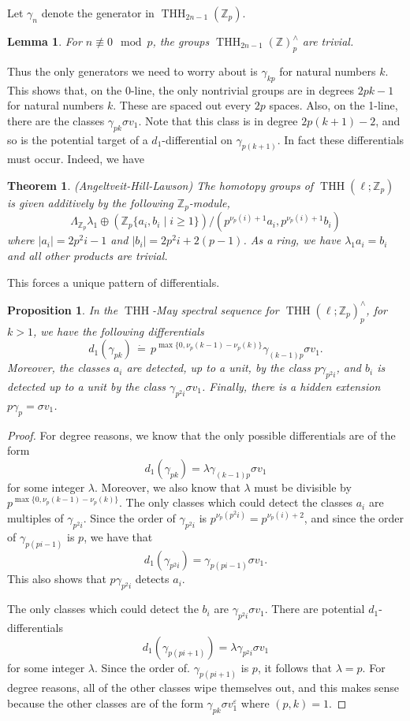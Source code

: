 \documentclass[12pt]{amsart}
\newcommand{\Z}{\mathbb{Z}}
\DeclareMathOperator{\THH}{THH}
\newtheorem{thm}[equation]{Theorem}
\newtheorem{lem}[equation]{Lemma}
\newtheorem{prop}[equation]{Proposition}
\theoremstyle{definition}
\numberwithin{equation}{section}
\numberwithin{figure}{section}
\begin{document}
Let $\gamma_n$ denote the generator in $\THH_{2n-1}(\Z_p)$. 

\begin{lem}
	For $n\not\equiv 0\mod p$, the groups $\THH_{2n-1}(\Z)^\wedge_p$ are trivial.
\end{lem}

Thus the only generators we need to worry about is $\gamma_{kp}$ for natural numbers $k$. This shows that, on the 0-line, the only nontrivial groups are in degrees $2pk-1$ for natural numbers $k$. These are spaced out every $2p$ spaces. Also, on the 1-line, there are the classes $\gamma_{pk}\sigma v_1$. Note that this class is in degree $2p(k+1)-2$, and so is the potential target of a $d_1$-differential on $\gamma_{p(k+1)}$. In fact these differentials must occur. Indeed, we have 

\begin{thm}(Angeltveit-Hill-Lawson)
	The homotopy groups of $\THH(\ell;\Z_p)$ is given additively by the following $\Z_p$-module, 
	\[
	\Lambda_{\Z_p}\lambda_1\oplus\left(\Z_p\{a_i, b_i\mid i\geq 1\}\right)/(p^{\nu_p(i)+1}a_i,p^{\nu_p(i)+1}b_i)
	\]
	where $|a_i| = 2p^2i-1$ and $|b_i| = 2p^2i+2(p-1)$. As a ring, we have $\lambda_1a_i = b_i$ and all other products are trivial.
\end{thm}

This forces a unique pattern of differentials. 

\begin{prop}
	In the $\THH$-May spectral sequence for $\THH(\ell;\Z_p)^\wedge_p$, for $k>1$, we have the following differentials
	\[
	d_1(\gamma_{pk}) \, \dot{=}\, p^{\max\{0, \nu_p(k-1)-\nu_p(k)\}}\gamma_{(k-1)p}\sigma v_1.
	\]
	Moreover, the classes $a_i$ are detected, up to a unit, by the class $p\gamma_{p^2i}$, and $b_i$ is detected up to a unit by the class $\gamma_{p^2i}\sigma v_1$. Finally, there is a hidden extension $p \gamma_p = \sigma v_1$.
\end{prop}
\begin{proof}
	
	For degree reasons, we know that the only possible differentials are of the form 
	\[
	d_1(\gamma_{pk}) = \lambda \gamma_{(k-1)p}\sigma v_1
	\]
	for some integer $\lambda$. Moreover, we also know that $\lambda$ must be divisible by $p^{\max\{0, \nu_p(k-1)-\nu_p(k)\}}$. The only classes which could detect the classes $a_i$ are multiples of $\gamma_{p^2i}$. Since the order of $\gamma_{p^2i}$ is $p^{\nu_p(p^2i)} = p^{\nu_p(i)+2}$, and since the order of $\gamma_{p(pi-1)}$ is $p$, we have that 
	\[
	d_1(\gamma_{p^2i}) = \gamma_{p(pi-1)}\sigma v_1. 
	\]
	This also shows that $p\gamma_{p^2i}$ detects $a_i$. 
	
	The only classes which could detect the $b_i$ are $\gamma_{p^2i}\sigma v_1$. There are potential $d_1$-differentials
	\[
	d_1(\gamma_{p(pi+1)}) = \lambda \gamma_{p^2i}\sigma v_1
	\]
	for some integer $\lambda$. Since the order of. $\gamma_{p(pi+1)}$ is $p$, it follows that $\lambda = p$. For degree reasons, all of the other classes wipe themselves out, and this makes sense because the other classes are of the form $\gamma_{pk}\sigma v_1^{\varepsilon}$ where $(p,k)=1$. 
\end{proof}
\end{document}
